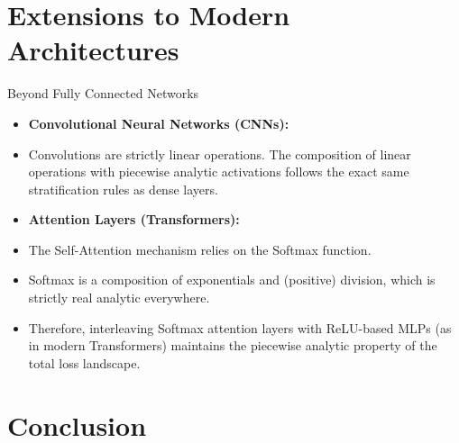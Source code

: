 \documentclass[10pt, aspectratio=169]{beamer}
\theoremstyle{definition}
\begin{document}
\section{Extensions to Modern Architectures}

\begin{frame}{Beyond Fully Connected Networks}
    \begin{itemize}
        \item \textbf{Convolutional Neural Networks (CNNs):}
        \item Convolutions are strictly linear operations. The composition of linear operations with piecewise analytic activations follows the exact same stratification rules as dense layers.
        \item \textbf{Attention Layers (Transformers):}
        \item The Self-Attention mechanism relies on the Softmax function.
        \item Softmax is a composition of exponentials and (positive) division, which is strictly real analytic everywhere.
        \item Therefore, interleaving Softmax attention layers with ReLU-based MLPs (as in modern Transformers) maintains the piecewise analytic property of the total loss landscape.
    \end{itemize}
\end{frame}

\section{Conclusion}

\end{document}
